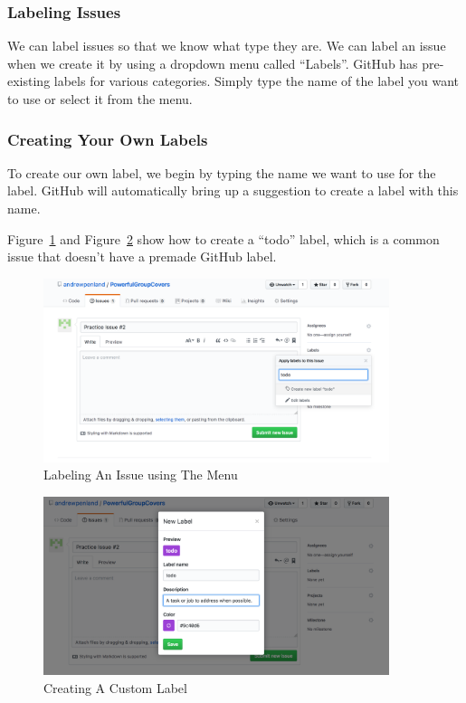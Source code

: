 \documentclass[11pt]{article}
\begin{document}
\subsubsection{Labeling Issues}

We can label issues so that we know what type they are. We can label an issue when we create it by using a dropdown menu called ``Labels''. GitHub has pre-existing labels for various categories. Simply type the name of the label you want to use or select it from the menu. 

\subsubsection{Creating Your Own Labels}

To create our own label, we begin by typing the name we want to use for the label. GitHub will automatically bring up a suggestion to create a label with this name.

Figure~\ref{fig:begin-typing-todo} and Figure~\ref{fig:todo-label-details} show how to create a ``todo'' label, which is a common issue that doesn't have a premade GitHub label. 


\begin{figure}\label{fig:begin-typing-todo}
\includegraphics[width=0.9\textwidth]{CreatingLabels}
\caption{Labeling An Issue using The Menu}
\end{figure}

\begin{figure}\label{fig:todo-label-details}
\includegraphics[width=0.9\textwidth]{NewLabelBox}
\caption{Creating A Custom Label}
\end{figure}
\end{document}
